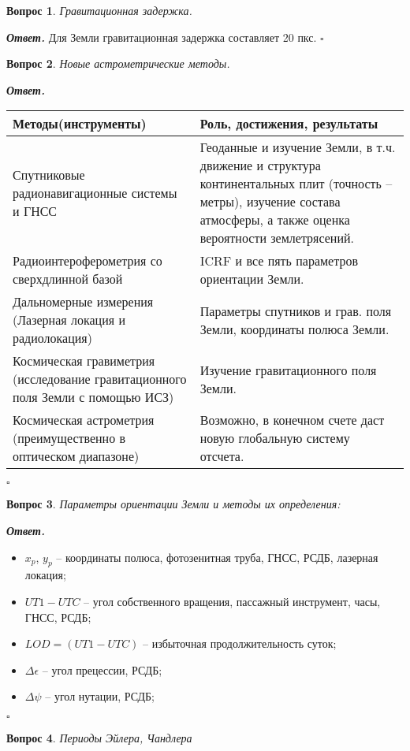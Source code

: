 \documentclass[12pt]{article}
\newtheorem{problem}{Вопрос}
\newenvironment{solution}[1][\it{Ответ}]{\textbf{#1. } }{$\square$}
\begin{document}
		\begin{problem}
			Гравитационная задержка.
		\end{problem}
		
		\begin{solution}
		Для Земли гравитационная задержка составляет 20 пкс.
		\end{solution}
		
		
		
		\begin{problem}
			Новые астрометрические методы.
		\end{problem}
		
		\begin{solution}
			\begin{center}
				\begin{tabular}{||p{8cm} p{8cm}||} 
					\hline
					Методы(инструменты) & Роль, достижения, результаты  \\ [0.5ex] 
					\hline\hline
					Спутниковые радионавигационные системы и ГНСС & Геоданные и изучение Земли, в т.ч. движение и структура континентальных плит (точность -- метры), изучение состава атмосферы, а также оценка вероятности землетрясений. \\ 
					\hline
					Радиоинтероферометрия со сверхдлинной базой & ICRF и все пять параметров ориентации Земли. \\
					\hline
					Дальномерные измерения (Лазерная локация и радиолокация) & Параметры спутников и грав. поля Земли, координаты полюса Земли. \\
					\hline
					Космическая гравиметрия (исследование гравитационного поля Земли с помощью ИСЗ) & Изучение гравитационного поля Земли.  \\
					\hline
					Космическая астрометрия (преимущественно в оптическом диапазоне) & Возможно, в конечном счете даст новую глобальную систему отсчета.  \\ [1ex] 
					\hline
				\end{tabular}
			\end{center}
		\end{solution}
		
		
		\begin{problem}
			Параметры ориентации Земли и методы их определения:
		\end{problem}
		
		\begin{solution}
			\begin{itemize}
				\item $x_p$, $y_p$ -- координаты полюса, фотозенитная труба, ГНСС, РСДБ, лазерная локация;
				\item $UT1-UTC$ -- угол собственного вращения, пассажный инструмент, часы, ГНСС,
				РСДБ;
				\item $LOD = (UT1 - UTC)$ -- избыточная продолжительность суток;
				\item $\Delta\epsilon$ -- угол прецессии, РСДБ;
				\item $\Delta\psi$ -- угол нутации, РСДБ;
			\end{itemize}
		\end{solution}
		\begin{problem}
			Периоды Эйлера, Чандлера
		\end{problem}
		
\end{document}
